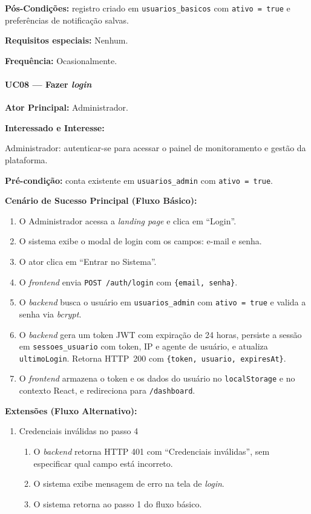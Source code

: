 \textbf{Pós-Condições:} registro criado em
\texttt{usuarios\_basicos} com \texttt{ativo = true} e
preferências de notificação salvas.

\textbf{Requisitos especiais:} Nenhum.

\textbf{Frequência:} Ocasionalmente.

\paragraph{UC08 --- Fazer \textit{login}}\hfill\break

\textbf{Ator Principal:} Administrador.

\textbf{Interessado e Interesse:}

Administrador: autenticar-se para acessar o painel de
monitoramento e gestão da plataforma.

\textbf{Pré-condição:} conta existente em
\texttt{usuarios\_admin} com \texttt{ativo = true}.

\textbf{Cenário de Sucesso Principal (Fluxo Básico):}
\begin{enumerate}
  \item O Administrador acessa a \textit{landing page} e
        clica em ``Login''.
  \item O sistema exibe o modal de login com os campos:
        e-mail e senha.
  \item O ator clica em ``Entrar no Sistema''.
  \item O \textit{frontend} envia
        \texttt{POST /auth/login} com \texttt{\{email, senha\}}.
  \item O \textit{backend} busca o usuário em
        \texttt{usuarios\_admin} com \texttt{ativo = true}
        e valida a senha via \textit{bcrypt}.
  \item O \textit{backend} gera um token JWT com expiração de 24 horas,
        persiste a sessão em \texttt{sessoes\_usuario} com token, IP e
        agente de usuário, e atualiza \texttt{ultimoLogin}. Retorna
        HTTP~200 com \texttt{\{token, usuario, expiresAt\}}.
  \item O \textit{frontend} armazena o token e os dados do usuário no
        \texttt{localStorage} e no contexto React, e redireciona
        para \texttt{/dashboard}.
\end{enumerate}

\textbf{Extensões (Fluxo Alternativo):}

\begin{enumerate}
  \renewcommand{\theenumi}{4a}
  \renewcommand{\labelenumi}{\theenumi.}
  \item Credenciais inválidas no passo 4
  \begin{enumerate}
  \item O \textit{backend} retorna HTTP 401 com
        ``Credenciais inválidas'', sem especificar qual
        campo está incorreto.
  \item O sistema exibe mensagem de erro na tela de
        \textit{login}.
  \item O sistema retorna ao passo 1 do fluxo básico.
  \end{enumerate}
\end{enumerate}

